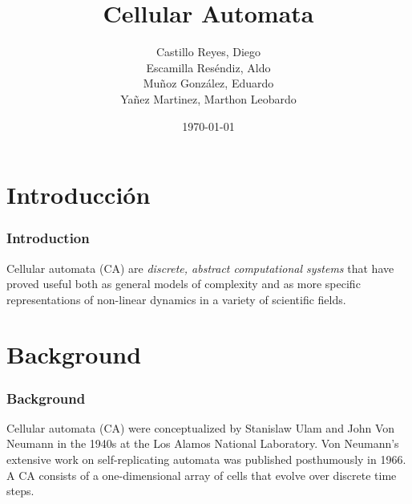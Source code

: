 \documentclass{beamer}
\title{Cellular Automata}
\author{Castillo Reyes, Diego\\
        Escamilla Reséndiz, Aldo\\
        Muñoz González, Eduardo\\
        Yañez Martinez, Marthon Leobardo\\}
\date{\today}
\begin{document}
\begin{frame}[plain]
    \titlepage
\end{frame}

\section{Introducción}
\begin{frame}
    \frametitle{Introduction}
    Cellular automata (CA) are \textit{discrete, abstract computational systems} that have proved useful both as general models of complexity and as more specific representations of non-linear dynamics in a variety of scientific fields.
\end{frame}

\section{Background}
\begin{frame}
    \frametitle{Background}
    Cellular automata (CA) were conceptualized by Stanislaw Ulam and John Von Neumann in the 1940s at the Los Alamos National Laboratory. Von Neumann's extensive work on self-replicating automata was published posthumously in 1966. A CA consists of a one-dimensional array of cells that evolve over discrete time steps.
\end{frame}
\end{document}
